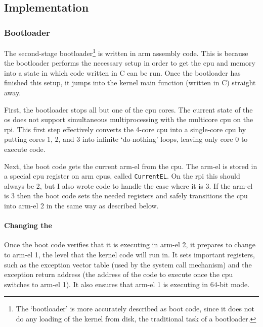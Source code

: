 \documentclass{article}
\begin{document}
\subsection{Implementation}

\subsubsection{Bootloader}
The second-stage bootloader\footnote{The `bootloader' is more accurately
described as boot code, since it does not do any loading of the kernel from
disk, the traditional task of a bootloader.} is written in \gls{arm} assembly
code. This is because the bootloader performs the necessary setup in order to
get the \gls{cpu} and memory into a state in which code written in C can be
run. Once the bootloader has finished this setup, it jumps into the kernel main
function (written in C) straight away.

First, the bootloader stops all but one of the \gls{cpu} cores. The current
state of the \gls{os} does not support simultaneous multiprocessing with the
multicore \gls{cpu} on the \gls{rpi}. This first step effectively converts the
4-core \gls{cpu} into a single-core \gls{cpu} by putting cores 1, 2, and 3 into
infinite `do-nothing' loops, leaving only core 0 to execute code.

Next, the boot code gets the current \gls{arm-el} from the \gls{cpu}. The
\gls{arm-el} is stored in a special \gls{cpu} register on \gls{arm}
\glspl{cpu}, called \verb!CurrentEL!. On the \gls{rpi} this should always be 2,
but I also wrote code to handle the case where it is 3. If the \gls{arm-el} is
3 then the boot code sets the needed registers and safely transitions the
\gls{cpu} into \gls{arm-el} 2 in the same way as described below.

\paragraph{Changing the \texorpdfstring{}{Exception Level}}
Once the boot code verifies that it is executing in \gls{arm-el} 2, it prepares
to change to \gls{arm-el} 1, the level that the kernel code will run in. It
sets important registers, such as the exception vector table (used by the
system call mechanism) and the exception return address (the address of the
code to execute once the \gls{cpu} switches to \gls{arm-el} 1). It also ensures
that \gls{arm-el} 1 is executing in 64-bit mode.
\end{document}
